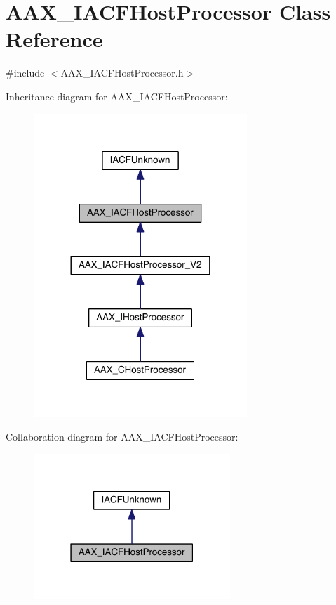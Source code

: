 \hypertarget{a00066}{}\section{A\+A\+X\+\_\+\+I\+A\+C\+F\+Host\+Processor Class Reference}
\label{a00066}


{\ttfamily \#include $<$A\+A\+X\+\_\+\+I\+A\+C\+F\+Host\+Processor.\+h$>$}



Inheritance diagram for A\+A\+X\+\_\+\+I\+A\+C\+F\+Host\+Processor\+:
\nopagebreak
\begin{figure}[H]
\begin{center}
\leavevmode
\includegraphics[width=228pt]{a00541}
\end{center}
\end{figure}


Collaboration diagram for A\+A\+X\+\_\+\+I\+A\+C\+F\+Host\+Processor\+:
\nopagebreak
\begin{figure}[H]
\begin{center}
\leavevmode
\includegraphics[width=210pt]{a00542}
\end{center}
\end{figure}


